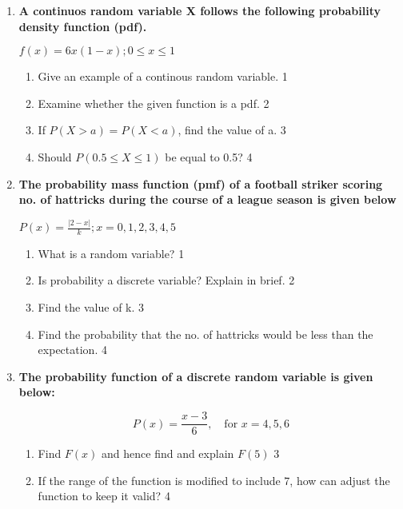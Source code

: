 \documentclass[a4paper,oneside, margin=1.4in]{book}
\begin{document}
\begin{enumerate}
   \item
	  \textbf{A continuos random variable X follows the following probability density function (pdf).} 
	  \begin{center}
	  $f(x) = 6x(1-x); 0\le x\le 1$
  \end{center}
  
  \begin{enumerate}
    \item
	Give an example of a continous random variable. \hfill 1
    \item
	Examine whether the given function is a pdf. \hfill 2
    \item  
	If $P(X>a) = P(X<a)$, find the value of a. \hfill 3
    \item
	Should $P(0.5 \le X \le 1)$  be equal to 0.5? \hfill 4
  \end{enumerate}
  
     \item
	  \textbf{The probability mass function (pmf) of a football striker scoring no. of hattricks during the course of a league season is given below}
	  
	  \begin{center}
	  $\displaystyle P(x)  = \frac{|2-x|}{k}; x = 0, 1, 2, 3, 4, 5$
	  \end{center}
  
  \begin{enumerate}
    \item
    What is a random variable? \hfill 1
    \item
		Is probability a discrete variable? Explain in brief. \hfill 2
    \item  
	Find the value of k.  \hfill 3
    \item
	Find the probability that the no. of hattricks would be less than the expectation. \hfill 4
  \end{enumerate}
  

  
   \item
	  \textbf{The probability function of a discrete random variable is given below:} 
  
   \begin{center}
	  \[
P(x) = \frac{x - 3}{6}, \quad \text{for } x = 4, 5, 6
\]
	  \end{center}
  
  \begin{enumerate}
    \item  
	Find $F(x)$ and hence find and explain $F(5)$ \hfill 3
    \item
	If the range of the function is modified to include 7, how can adjust the function to keep it valid? \hfill 4
  \end{enumerate}


\end{enumerate}
\end{document}
